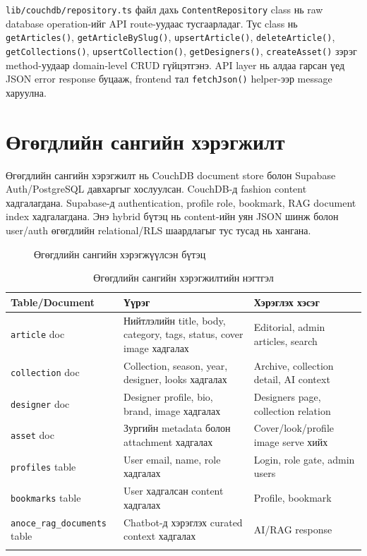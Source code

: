 \texttt{lib/couchdb/repository.ts} файл дахь \texttt{ContentRepository} class нь raw database operation-ийг API route-уудаас тусгаарладаг. Тус class нь \texttt{getArticles()}, \texttt{getArticleBySlug()}, \texttt{upsertArticle()}, \texttt{deleteArticle()}, \texttt{getCollections()}, \texttt{upsertCollection()}, \texttt{getDesigners()}, \texttt{createAsset()} зэрэг method-уудаар domain-level CRUD гүйцэтгэнэ. API layer нь алдаа гарсан үед JSON error response буцааж, frontend тал \texttt{fetchJson()} helper-ээр message харуулна.

\section{Өгөгдлийн сангийн хэрэгжилт}
Өгөгдлийн сангийн хэрэгжилт нь CouchDB document store болон Supabase Auth/PostgreSQL давхаргыг хослуулсан. CouchDB-д fashion content хадгалагдана. Supabase-д authentication, profile role, bookmark, RAG document index хадгалагдана. Энэ hybrid бүтэц нь content-ийн уян JSON шинж болон user/auth өгөгдлийн relational/RLS шаардлагыг тус тусад нь хангана.

\begin{figure}[htbp]
  \centering
  \resizebox{\textwidth}{!}{}
  \caption[Өгөгдлийн сангийн хэрэгжүүлсэн бүтэц]{Өгөгдлийн сангийн хэрэгжүүлсэн бүтэц}
  \label{fig:ch4-database-schema}
\end{figure}

\begin{longtable}{|L{0.20\textwidth}|L{0.34\textwidth}|L{0.32\textwidth}|}
  \hline
  \textbf{Table/Document} & \textbf{Үүрэг} & \textbf{Хэрэглэх хэсэг} \\ \hline
  \texttt{article} doc & Нийтлэлийн title, body, category, tags, status, cover image хадгалах & Editorial, admin articles, search \\ \hline
  \texttt{collection} doc & Collection, season, year, designer, looks хадгалах & Archive, collection detail, AI context \\ \hline
  \texttt{designer} doc & Designer profile, bio, brand, image хадгалах & Designers page, collection relation \\ \hline
  \texttt{asset} doc & Зургийн metadata болон attachment хадгалах & Cover/look/profile image serve хийх \\ \hline
  \texttt{profiles} table & User email, name, role хадгалах & Login, role gate, admin users \\ \hline
  \texttt{bookmarks} table & User хадгалсан content хадгалах & Profile, bookmark \\ \hline
  \texttt{anoce\_rag\_documents} table & Chatbot-д хэрэглэх curated context хадгалах & AI/RAG response \\ \hline
  \caption{Өгөгдлийн сангийн хэрэгжилтийн нэгтгэл}
  \label{tab:ch4-database-implementation}\\
\end{longtable}

